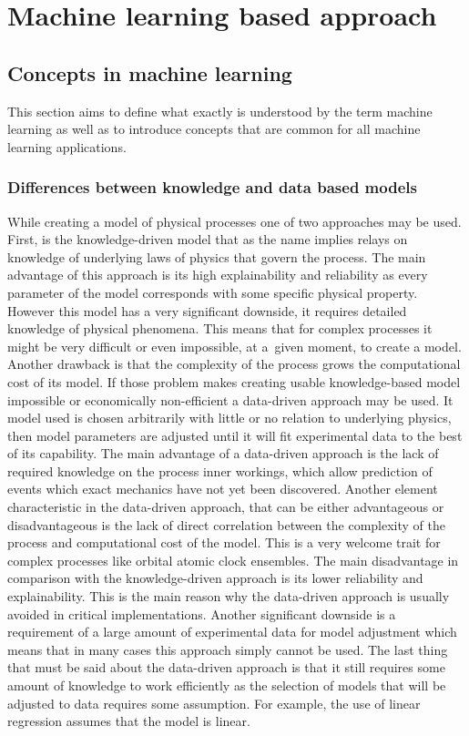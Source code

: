 \FloatBarrier
\chapter{Machine learning based approach}


\FloatBarrier
\section{Concepts in machine learning}
This section aims to define what exactly is understood by the term machine learning as well
as to introduce concepts that are common for all machine learning applications.

\FloatBarrier
\subsection{Differences between knowledge and data based models}
While creating a model of physical processes one of two approaches may be used.
First, is the knowledge-driven model that as the name implies relays on knowledge of underlying
laws of physics that govern the process.
The main advantage of this approach is its high explainability and reliability as every parameter
of the model corresponds with some specific physical property.
However this model has a very significant downside, it requires detailed knowledge of physical
phenomena. This means that for complex processes it might be very difficult or even
impossible, at a~given moment, to create a model. Another drawback is that the complexity of
the process grows the computational cost of its model.
If those problem makes creating usable knowledge-based model impossible or economically
non-efficient a data-driven approach may be used.
It model used is chosen arbitrarily with little or no relation to underlying physics,
then model parameters are adjusted until it will fit experimental data to the best of its
capability.
The main advantage of a data-driven approach is the lack of required knowledge on the process
inner workings, which allow prediction of events which exact mechanics have not
yet been discovered.
Another element characteristic in the data-driven approach, that can be either advantageous or
disadvantageous is the lack of direct correlation between the complexity
of the process and computational cost of the model.
This is a very welcome trait for complex processes like orbital atomic clock ensembles.
The main disadvantage in comparison with the knowledge-driven approach is its 
lower reliability and explainability. 
This is the main reason why the data-driven approach is usually avoided in
critical implementations. Another significant downside is a requirement of a large amount of
experimental data for model adjustment which means that in many cases this approach simply
cannot be used.
The last thing that must be said about the data-driven approach is that it still requires some
amount of knowledge to work efficiently as the selection of models that will be adjusted to
data requires some assumption. For example, the use of linear regression assumes that the model
is linear.

